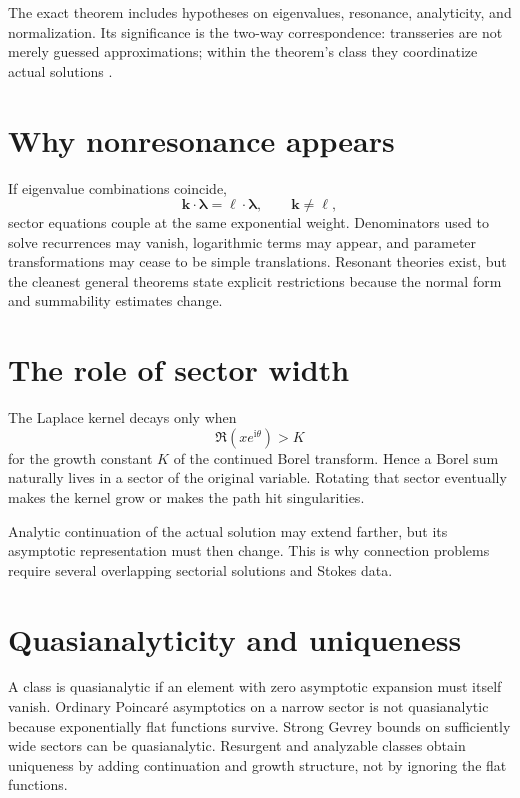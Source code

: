 \documentclass[11pt,openany]{book}
\theoremstyle{definition}
\theoremstyle{plain}
\theoremstyle{remark}
\newcommand{\ii}{\mathrm{i}}
\begin{document}
The exact theorem includes hypotheses on eigenvalues, resonance, analyticity, and normalization. Its significance is the two-way correspondence: transseries are not merely guessed approximations; within the theorem's class they coordinatize actual solutions \cite{costin-1995,costin-1998,costin-borel-stokes}.

\section{Why nonresonance appears}

If eigenvalue combinations coincide,
\[
 \mathbf k\cdot\boldsymbol\lambda
 =\boldsymbol\ell\cdot\boldsymbol\lambda,
 \qquad\mathbf k\ne\boldsymbol\ell,
\]
sector equations couple at the same exponential weight. Denominators used to solve recurrences may vanish, logarithmic terms may appear, and parameter transformations may cease to be simple translations. Resonant theories exist, but the cleanest general theorems state explicit restrictions because the normal form and summability estimates change.

\section{The role of sector width}

The Laplace kernel decays only when
\[
 \Re(xe^{\ii\theta})>K
\]
for the growth constant $K$ of the continued Borel transform. Hence a Borel sum naturally lives in a sector of the original variable. Rotating that sector eventually makes the kernel grow or makes the path hit singularities.

Analytic continuation of the actual solution may extend farther, but its asymptotic representation must then change. This is why connection problems require several overlapping sectorial solutions and Stokes data.

\section{Quasianalyticity and uniqueness}

A class is quasianalytic if an element with zero asymptotic expansion must itself vanish. Ordinary Poincar\'e asymptotics on a narrow sector is not quasianalytic because exponentially flat functions survive. Strong Gevrey bounds on sufficiently wide sectors can be quasianalytic. Resurgent and analyzable classes obtain uniqueness by adding continuation and growth structure, not by ignoring the flat functions.
\end{document}
